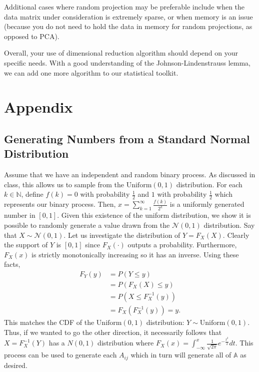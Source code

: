 \documentclass{article}
\begin{document}
Additional cases where random projection may be preferable include when the data matrix under consideration is extremely sparse, or when memory is an issue (because you do not need to hold the data in memory for random projections, as opposed to PCA).

Overall, your use of dimensional reduction algorithm should depend on your specific needs. With a good understanding of the Johnson-Lindenstrauss lemma, we can add one more algorithm to our statistical toolkit.

\section{Appendix}
    \subsection{Generating Numbers from a Standard Normal Distribution}\label{stdnorm}
    Assume that we have an independent and random binary process. As discussed in class, this allows us to sample from the $\text{Uniform}(0,1)$ distribution. For each $k \in \mathbb{N}$, define $f(k)=0$ with probability $\frac{1}{2}$ and $1$ with probability $\frac{1}{2}$ which represents our binary process. Then, $x = \sum_{k=1}^\infty \frac{f(k)}{2^k}$ is a uniformly generated number in $[0,1]$. Given this existence of the uniform distribution, we show it is possible to randomly generate a value drawn from the $\mathcal{N}(0,1)$ distribution. Say that $X \sim \mathcal{N}(0,1)$. Let us investigate the distribution of $Y=F_X(X).$ Clearly the support of $Y$ is $[0,1]$ since $F_X(\cdot)$ outputs a probability. Furthermore, $F_X(x)$ is strictly monotonically increasing so it has an inverse. Using these facts,
    \begin{align*}
        F_Y(y) &= P(Y \leq y) \\
        &=P(F_X(X) \leq y)\\
        &=P(X \leq F_X^{-1}(y))\\
        &=F_X(F_X^{-1}(y))=y.
    \end{align*}
    This matches the CDF of the $\text{Uniform}(0,1)$ distribution: $Y \sim \text{Uniform}(0,1)$. Thus, if we wanted to go the other direction, it necessarily follows that $X = F_X^{-1}(Y)$ has a $N(0,1)$ distribution where $F_X(x) = \int_{-\infty}^x \frac{1}{\sqrt{2\pi}}e^{-\frac{t^2}{2}}dt.$ This process can be used to generate each $A_{ij}$ which in turn will generate all of $\mathbb{A}$ as desired.
    
\end{document}

